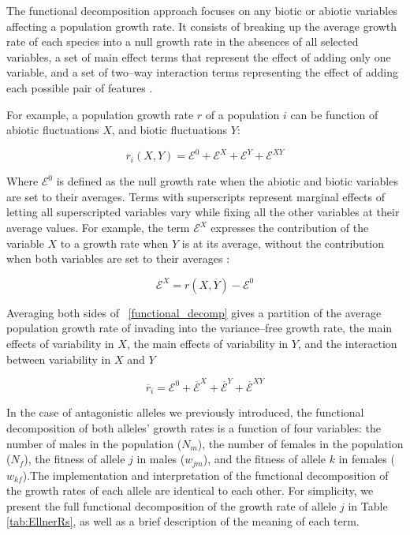 \documentclass[]{article}
\begin{document}
The functional decomposition approach focuses on any biotic or abiotic variables affecting a population growth rate. It consists of breaking up the average growth rate of each species into a null growth rate in the absences of all selected variables, a set of main effect terms that represent the effect of adding only one variable, and a set of two--way interaction terms representing the effect of adding each possible pair of features \citep{ellner_expanded_2019}.

For example, a population growth rate $r$ of a population $i$ can be function of abiotic fluctuations $X$, and biotic fluctuations $Y$:

\begin{equation}
   r_{i}(X,Y) = \mathcal{E}^{0} + \mathcal{E}^{X}+ \mathcal{E}^{Y}+ \mathcal{E}^{XY}
   \label{functional_decomp}
\end{equation}

Where $\mathcal{E}^0$ is defined as the null growth rate when the abiotic and biotic variables are set to their averages. Terms with superscripts represent marginal effects of letting all superscripted variables vary while fixing all the other variables at their average values. For example, the term $\mathcal{E}^X$ expresses the contribution of the variable $X$ to a growth rate when $Y$ is at its average, without the contribution when both variables are set to their averages :

\begin{equation}
  \mathcal{E}^{X} = r(X,\overline{Y}) - \mathcal{E}^{0}
\end{equation}


Averaging both sides of ~\ref{functional_decomp} gives a partition of the average population growth rate of invading into the variance--free growth rate, the main effects of variability in $X$, the main effects of variability in $Y$, and the interaction between variability in $X$ and $Y$

\begin{equation}
    \overline{r}_{i}= \mathcal{E}^{0} + \overline{\mathcal{E}}^{X}+ \overline{\mathcal{E}}^{Y}+ \overline{\mathcal{E}}^{XY}
   \label{functional_decomp_2}
\end{equation}

In the case of antagonistic alleles we previously introduced, the functional decomposition of both alleles' growth rates is a function of four variables: the number of males in the population ($N_{m}$), the number of females in the population ($N_{f}$), the fitness of allele $j$ in males ($w_{jm}$), and the fitness of allele $k$ in females ($w_{kf}$).The implementation and interpretation of the functional decomposition of the growth rates of each allele are identical to each other. For simplicity,  we present the full functional decomposition of the growth rate of allele $j$ in Table \ref{tab:EllnerRs}, as well as a brief description of the meaning of each term.
\end{document}
